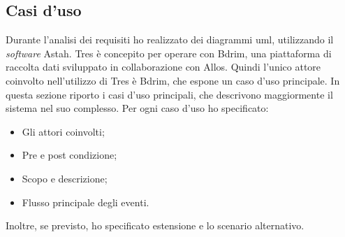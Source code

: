 \newpage
\subsection{Casi d'uso}
Durante l'analisi dei requisiti ho realizzato dei diagrammi \gls{uml}, utilizzando il \emph{software} Astah. Tres è concepito per operare con Bdrim, una piattaforma di raccolta dati sviluppato in collaborazione con Allos. Quindi l'unico attore coinvolto nell'utilizzo di Tres è Bdrim, che espone un caso d'uso principale. In questa sezione riporto i casi d'uso principali, che descrivono maggiormente il sistema nel suo complesso. Per ogni caso d'uso ho specificato: 
\begin{itemize}
\item Gli attori coinvolti;
\item Pre e post condizione;
\item Scopo e descrizione;
\item Flusso principale degli eventi.
\end{itemize}
Inoltre, se previsto, ho specificato estensione e lo scenario alternativo.
\newpage
